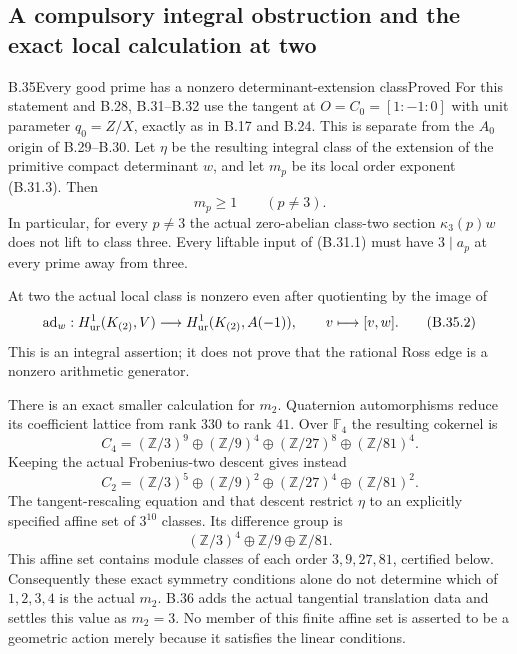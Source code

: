 \subsection{A compulsory integral obstruction and the exact local calculation at two}

\begin{statement}{B.35}{Every good prime has a nonzero determinant-extension class}{Proved}
For this statement and B.28, B.31--B.32 use the tangent at
$O=C_0=[1:-1:0]$ with unit parameter $q_0=Z/X$, exactly as
in B.17 and B.24. This is separate from the $A_0$ origin
of B.29--B.30. Let $\eta$ be the resulting integral class
of the extension of the primitive compact determinant
$w$, and let $m_p$ be its local order exponent (B.31.3).
Then
\[
                         m_p\ge1\qquad(p\ne3).                \tag{B.35.1}
\]
In particular, for every $p\ne3$ the actual zero-abelian
class-two section $\kappa_3(p)w$ does not lift to class three.
Every liftable input of (B.31.1) must have $3\mid a_p$ at
every prime away from three.

At two the actual local class is nonzero even after
quotienting by the image of
\[
 \operatorname{ad}_w:H^1_{\rm ur}(K_{(2)},V)
           \longrightarrow H^1_{\rm ur}(K_{(2)},A(-1)),
       \qquad v\longmapsto[v,w].                              \tag{B.35.2}
\]
This is an integral assertion; it does not prove that the
rational Ross edge is a nonzero arithmetic generator.

There is an exact smaller calculation for $m_2$.
Quaternion automorphisms reduce its coefficient lattice
from rank $330$ to rank $41$.
Over $\mathbb F_4$ the resulting cokernel is
\[
 C_4=(\mathbb Z/3)^9\oplus(\mathbb Z/9)^4
       \oplus(\mathbb Z/27)^8\oplus(\mathbb Z/81)^4.
                                                               \tag{B.35.3}
\]
Keeping the actual Frobenius-two descent gives instead
\[
 C_2=(\mathbb Z/3)^5\oplus(\mathbb Z/9)^2
       \oplus(\mathbb Z/27)^4\oplus(\mathbb Z/81)^2.
                                                               \tag{B.35.4}
\]
The tangent-rescaling equation and that descent restrict
$\eta$ to an explicitly specified affine set of $3^{10}$
classes. Its difference group is
\[
                (\mathbb Z/3)^4\oplus\mathbb Z/9
                           \oplus\mathbb Z/81.                \tag{B.35.5}
\]
This affine set contains module classes of each order
$3,9,27,81$, certified below. Consequently these exact
symmetry conditions alone do not determine which of
$1,2,3,4$ is the actual $m_2$.
B.36 adds the actual tangential translation data and
settles this value as $m_2=3$.
No member of this finite affine set is asserted to be a
geometric action merely because it satisfies the linear conditions.
\end{statement}
